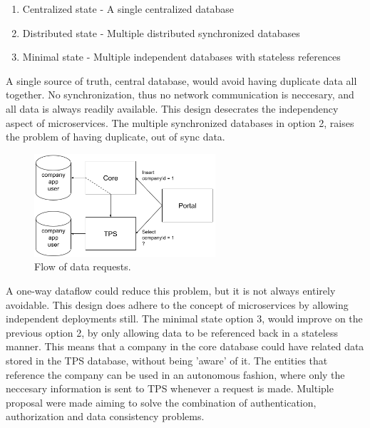 \begin{enumerate}
	\item Centralized state - A single centralized database
	\item Distributed state - Multiple distributed synchronized databases
	\item Minimal state - Multiple independent databases with stateless references
\end{enumerate}

A single source of truth, central database, would avoid having duplicate data all together. No synchronization, thus no network communication is neccesary, and all data is always readily available. This design desecrates the independency aspect of microservices. The multiple synchronized databases in option 2, raises the problem of having duplicate, out of sync data.

\begin{figure}[H]
	\centering
	\includegraphics[width=0.6\textwidth]{DataSync}
	\caption[DataSync]{Flow of data requests.}
	\label{fig:DataSync}
\end{figure}

A one-way dataflow could reduce this problem, but it is not always entirely avoidable. This design does adhere to the concept of microservices by allowing independent deployments still. The minimal state option 3, would improve on the previous option 2, by only allowing data to be referenced back in a stateless manner. This means that a company in the core database could have related data stored in the TPS database, without being 'aware' of it. The entities that reference the company can be used in an autonomous fashion, where only the neccesary information is sent to TPS whenever a request is made. Multiple proposal were made aiming to solve the combination of authentication, authorization and data consistency problems.

%
